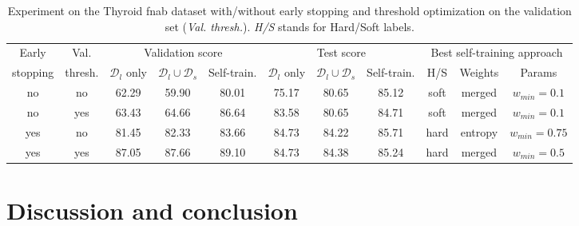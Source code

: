 \begin{table}
  \centering 
  \footnotesize
  \begin{tabular}{|cc|ccc|ccc|ccc|}
    \hline
    Early & Val. & \multicolumn{3}{c|}{Validation score} & \multicolumn{3}{c|}{Test score} & \multicolumn{3}{c|}{Best self-training approach} \\
    stopping & thresh. & $\mathcal{D}_l$ only & $\mathcal{D}_l \cup \mathcal{D}_s$ & Self-train. & $\mathcal{D}_l$ only & $\mathcal{D}_l \cup \mathcal{D}_s$ & Self-train. & H/S & Weights & Params \\
    \hline
    no & no & 62.29 & 59.90 & 80.01 & 75.17 & 80.65 & 85.12 & soft & merged & $w_{min}=0.1$ \\
    no & yes & 63.43 & 64.66 & 86.64 & 83.58 & 80.65 & 84.71 & soft & merged & $w_{min}=0.1$ \\  
    yes & no & 81.45 & 82.33 & 83.66 & 84.73 & 84.22 & 85.71 & hard & entropy & $w_{min}=0.75$ \\
    yes & yes & 87.05 & 87.66 & 89.10 & 84.73 & 84.38 & 85.24 & hard & merged & $w_{min}=0.5$ \\
    \hline
  \end{tabular}
  \caption{Experiment on the Thyroid \acrshort{fnab} dataset with/without early stopping and threshold optimization on the validation set (\textit{Val. thresh.}). \textit{H/S} stands for Hard/Soft labels.}
  \label{tab:strain:thyroidresults}
\end{table}



\section{Discussion and conclusion}

\parencite{haridas2015interactive, petit2018handling, petit2021iterative}